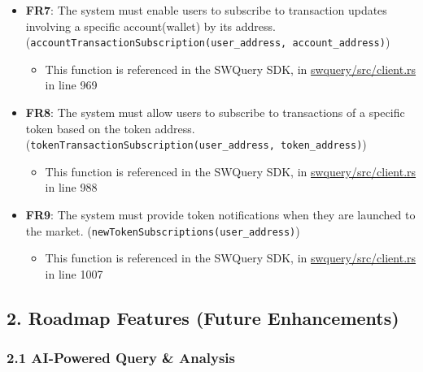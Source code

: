 \documentclass[
]{article}
\providecommand{\tightlist}{%
  \setlength{\itemsep}{0pt}\setlength{\parskip}{0pt}}
\begin{document}
\begin{itemize}
\tightlist
\item
  \textbf{FR7}: The system must enable users to subscribe to transaction
  updates involving a specific account(wallet) by its address.
  (\texttt{accountTransactionSubscription(user\_address,\ account\_address)})

  \begin{itemize}
  \tightlist
  \item
    This function is referenced in the SWQuery SDK, in
    \href{https://github.com/SWQuery/swquery/blob/main/swquery/src/client.rs}{swquery/src/client.rs}
    in line 969
  \end{itemize}
\item
  \textbf{FR8}: The system must allow users to subscribe to transactions
  of a specific token based on the token address.
  (\texttt{tokenTransactionSubscription(user\_address,\ token\_address)})

  \begin{itemize}
  \tightlist
  \item
    This function is referenced in the SWQuery SDK, in
    \href{https://github.com/SWQuery/swquery/blob/main/swquery/src/client.rs}{swquery/src/client.rs}
    in line 988
  \end{itemize}
\item
  \textbf{FR9}: The system must provide token notifications when they
  are launched to the market.
  (\texttt{newTokenSubscriptions(user\_address)})

  \begin{itemize}
  \tightlist
  \item
    This function is referenced in the SWQuery SDK, in
    \href{https://github.com/SWQuery/swquery/blob/main/swquery/src/client.rs}{swquery/src/client.rs}
    in line 1007
  \end{itemize}
\end{itemize}

\hypertarget{roadmap-features-future-enhancements}{%
\subsection{\texorpdfstring{\textbf{2. Roadmap Features (Future
Enhancements)}}{2. Roadmap Features (Future Enhancements)}}\label{roadmap-features-future-enhancements}}

\hypertarget{ai-powered-query-analysis}{%
\subsubsection{\texorpdfstring{\textbf{2.1 AI-Powered Query \&
Analysis}}{2.1 AI-Powered Query \& Analysis}}\label{ai-powered-query-analysis}}
\end{document}

